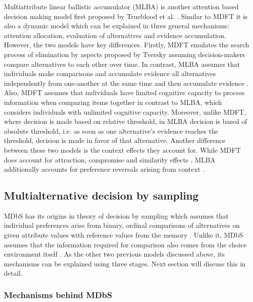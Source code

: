 \documentclass[a4paper,12pt]{article}
\newcommand{\citeyearonly}[1]{\citeyearpar{#1}}
\begin{document}
Multiattribute linear ballistic accumulator (MLBA) is another attention based decision making model first proposed by Trueblood et al. \citeyearonly{trueblood2014multiattribute}. Similar to MDFT it is also a dynamic model which can be explained in three general mechanisms: attention allocation, evaluation of alternatives and evidence accumulation. However, the two models have key differences. Firstly, MDFT emulates the search process of elimination by aspects proposed by Tversky \citeyearonly{tversky1972elimination} assuming decision-makers compare alternatives to each other over time. In contrast, MLBA assumes that individuals make comparisons and accumulate evidence all alternatives independently from one-another at the same time and then accumulate evidence \citep{trueblood15fragile}. Also, MDFT assumes that individuals have limited cognitive capacity to process information when comparing items together in contrast to MLBA, which considers individuals with unlimited cognitive capacity. Moreover, unlike MDFT, where decision is made based on relative threshold, in MLBA decision is based of absolute threshold, i.e. as soon as one alternative's evidence reaches the threshold, decision is made in favor of that alternative. Another difference between these two models is the context effects they account for. While MDFT does account for attraction, compromise and similarity effects \citep{hotaling2019quantitative}, MLBA additionally accounts for preference reversals arising from context \citep{trueblood15fragile}. 


\subsection{Multialternative decision by sampling}

MDbS has its origins in theory of decision by sampling which assumes that individual preferences arise from binary, ordinal comparisons of alternatives on given attribute values with reference values from the memory \citep{stewart2006decision}. Unlike it, MDbS assumes that the information required for comparison also comes from the choice environment itself \citep{noguchi2018multialternative}. As the other two previous models discussed above, its mechanisms can be explained using three stages. Next section will discuss this in detail.

\subsubsection{Mechanisms behind MDbS} \label{subsec:mechanismMDBS}
\end{document}
